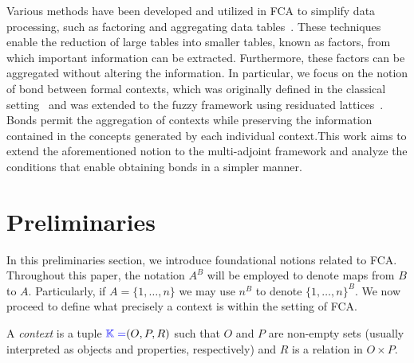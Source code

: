 \documentclass[runningheads,a4paper]{llncs}
\newcommand{\K}{\mathbb{K}}
\newcommand{\cb}[1]{{\color{blue}#1}}
\begin{document}
Various methods have been developed and utilized in FCA to simplify data processing,%
such as factoring and aggregating data tables~\cite{COAMfac2024,BELOHLAVEK20103,dubois:2012,KRIDLO22IS,valverdeipmu18art}. These techniques enable the reduction of large tables into smaller tables, known as factors, from which important information can be extracted. Furthermore, these factors can be aggregated without altering the information. 
In particular, we focus on the notion of bond between formal contexts, which was originally defined in the classical setting~\cite{GanterW}  and was extended to the fuzzy framework using residuated lattices~\cite{KridloKO12}.  Bonds permit the aggregation of contexts while preserving the information contained in the concepts generated by each individual context.This work aims to extend the aforementioned notion to the multi-adjoint framework and analyze the conditions that enable obtaining bonds in a simpler manner.



\section{Preliminaries}

In this preliminaries section, we introduce foundational notions related to FCA. Throughout this paper, the notation $A^B$ will be employed to denote maps from $B$ to $A$. Particularly, if $A = \{1, \dots, n\}$ we may use $n^B$ to denote $\{1, \dots, n\}^B$. We now proceed to define what precisely a context is within the setting of FCA.

\begin{definition}

A \emph{context} is a tuple $\cb{\K=}(O, P, R)$ such that $O$ and $P$ are non-empty sets (usually interpreted as objects and properties, respectively) and $R$ is a relation in $O \times P$.

\end{definition}
\end{document}
